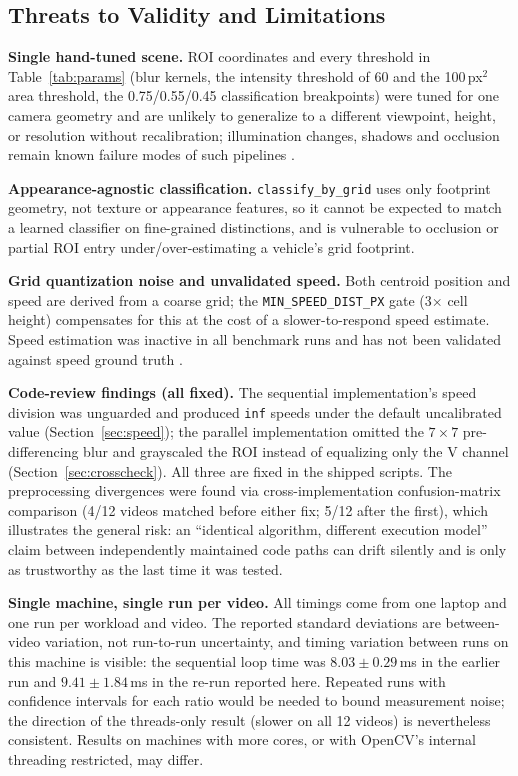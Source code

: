 \documentclass[conference]{IEEEtran}
\newcommand{\code}[1]{\texttt{#1}}
\begin{document}
\subsection{Threats to Validity and Limitations}
\label{sec:threats}

\textbf{Single hand-tuned scene.} ROI coordinates and every threshold in
Table~\ref{tab:params} (blur kernels, the intensity threshold of 60 and
the 100\,px$^2$ area threshold, the 0.75/0.55/0.45 classification
breakpoints) were tuned for one camera geometry and are unlikely to
generalize to a different viewpoint, height, or resolution without
recalibration; illumination changes, shadows and occlusion remain known
failure modes of such pipelines \cite{abbas2021,chen2020}.

\textbf{Appearance-agnostic classification.} \code{classify\_by\_grid}
uses only footprint geometry, not texture or appearance features, so it
cannot be expected to match a learned classifier on fine-grained
distinctions, and is vulnerable to occlusion or partial ROI entry
under/over-estimating a vehicle's grid footprint.

\textbf{Grid quantization noise and unvalidated speed.} Both centroid
position and speed are derived from a coarse grid; the
\code{MIN\_SPEED\_DIST\_PX} gate (3$\times$ cell height) compensates for
this at the cost of a slower-to-respond speed estimate. Speed estimation
was inactive in all benchmark runs and has not been validated against
speed ground truth \cite{kamil2024,sangsuwan2024}.

\textbf{Code-review findings (all fixed).} The sequential
implementation's speed division was unguarded and produced \code{inf}
speeds under the default uncalibrated value (Section~\ref{sec:speed});
the parallel implementation omitted the $7\times7$ pre-differencing blur
and grayscaled the ROI instead of equalizing only the V channel
(Section~\ref{sec:crosscheck}). All three are fixed in the shipped
scripts. The preprocessing divergences were found via cross-implementation
confusion-matrix comparison (4/12 videos matched before either fix; 5/12
after the first), which illustrates the general risk: an ``identical
algorithm, different execution model'' claim between independently
maintained code paths can drift silently and is only as trustworthy as
the last time it was tested.

\textbf{Single machine, single run per video.} All timings come from one
laptop and one run per workload and video. The reported standard
deviations are between-video variation, not run-to-run uncertainty, and
timing variation between runs on this machine is visible: the sequential
loop time was $8.03\pm0.29$\,ms in the earlier run and $9.41\pm1.84$\,ms
in the re-run reported here. Repeated runs with confidence intervals for
each ratio \cite{kalibera2013} would be needed to bound measurement noise;
the direction of the threads-only result (slower on all 12 videos) is
nevertheless consistent. Results on machines with more cores, or with
OpenCV's internal threading restricted, may differ.
\end{document}
